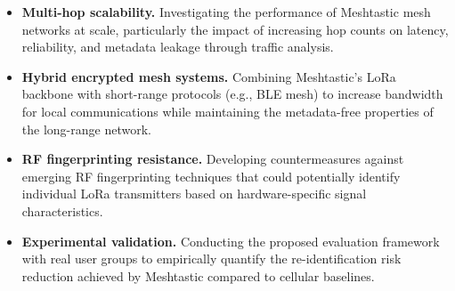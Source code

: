\begin{itemize}
    \item \textbf{Multi-hop scalability.} Investigating the performance of Meshtastic mesh networks at scale, particularly the impact of increasing hop counts on latency, reliability, and metadata leakage through traffic analysis.
    \item \textbf{Hybrid encrypted mesh systems.} Combining Meshtastic's LoRa backbone with short-range protocols (e.g., BLE mesh) to increase bandwidth for local communications while maintaining the metadata-free properties of the long-range network.
    \item \textbf{RF fingerprinting resistance.} Developing countermeasures against emerging RF fingerprinting techniques that could potentially identify individual LoRa transmitters based on hardware-specific signal characteristics.
    \item \textbf{Experimental validation.} Conducting the proposed evaluation framework with real user groups to empirically quantify the re-identification risk reduction achieved by Meshtastic compared to cellular baselines.
\end{itemize}
\newpage